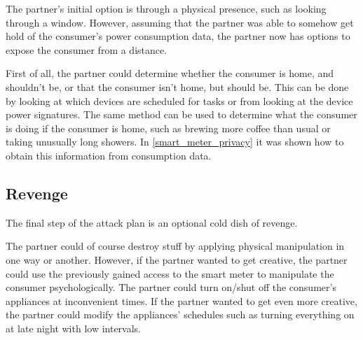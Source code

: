 The partner's initial option is through a physical presence, such as looking through a window.
However, assuming that the partner was able to somehow get hold of the consumer's power consumption data, the partner now has options to expose the consumer from a distance.

First of all, the partner could determine whether the consumer is home, and shouldn't be, or that the consumer isn't home, but should be.
This can be done by looking at which devices are scheduled for tasks or from looking at the device power signatures.
The same method can be used to determine what the consumer is doing if the consumer is home, such as brewing more coffee than usual or taking unusually long showers.
In \cref{smart_meter_privacy} it was shown how to obtain this information from consumption data.

\subsection{Revenge}
The final step of the attack plan is an optional cold dish of revenge.

The partner could of course destroy stuff by applying physical manipulation in one way or another.
However, if the partner wanted to get creative, the partner could use the previously gained access to the smart meter to manipulate the consumer psychologically.
The partner could turn on/shut off the consumer's appliances at inconvenient times.
If the partner wanted to get even more creative, the partner could modify the appliances' schedules such as turning everything on at late night with low intervals.
